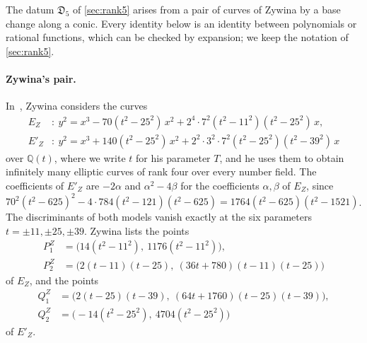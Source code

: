 \documentclass[12pt,oneside,openany]{book}
\theoremstyle{definition}
\theoremstyle{plain}
\numberwithin{equation}{chapter}
\theoremstyle{plain}
\theoremstyle{definition}
\theoremstyle{remark}
\newcommand{\Q}{\mathbb Q}
\newcommand{\datum}{\mathfrak D}
\begin{document}
The datum $\datum_5$ of \cref{sec:rank5} arises from a pair of curves of Zywina by a base change along a conic. Every identity below is an identity between polynomials or rational functions, which can be checked by expansion; we keep the notation of \cref{sec:rank5}.

\paragraph{Zywina's pair.} In~\cite[\S6.5]{Zywina2026}, Zywina considers the curves
\begin{equation}\label{r5o:zywina}
\begin{aligned}
E_Z&:\ y^2=x^3-70(t^2-25^2)\,x^2+2^4\cdot7^2(t^2-11^2)(t^2-25^2)\,x,\\
E'_Z&:\ y^2=x^3+140(t^2-25^2)\,x^2+2^2\cdot3^2\cdot7^2(t^2-25^2)(t^2-39^2)\,x
\end{aligned}
\end{equation}
over $\Q(t)$, where we write $t$ for his parameter $T$, and he uses them to obtain infinitely many elliptic curves of rank four over every number field. The coefficients of $E'_Z$ are $-2\alpha$ and $\alpha^2-4\beta$ for the coefficients $\alpha,\beta$ of $E_Z$, since $70^2(t^2-625)^2-4\cdot784(t^2-121)(t^2-625)=1764(t^2-625)(t^2-1521)$. The discriminants of both models vanish exactly at the six parameters $t=\pm11,\pm25,\pm39$. Zywina lists the points
\[
\begin{aligned}
P^Z_1&=\big(14(t^2-11^2),\ 1176(t^2-11^2)\big),\\
P^Z_2&=\big(2(t-11)(t-25),\ (36t+780)(t-11)(t-25)\big)
\end{aligned}
\]
of $E_Z$, and the points
\[
\begin{aligned}
Q^Z_1&=\big(2(t-25)(t-39),\ (64t+1760)(t-25)(t-39)\big),\\
Q^Z_2&=\big(-14(t^2-25^2),\ 4704(t^2-25^2)\big)
\end{aligned}
\]
of $E'_Z$. %
\end{document}

